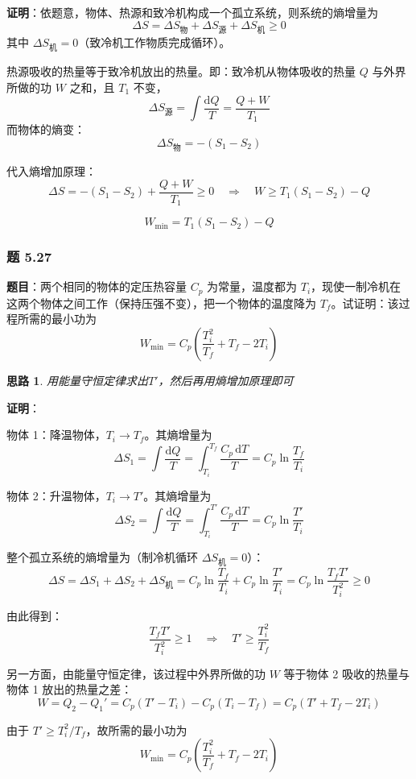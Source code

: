 \documentclass[UTF8]{ctexart}
\newtheorem{thoughts}{思路}[subsection]
\begin{document}
\textbf{证明}：依题意，物体、热源和致冷机构成一个孤立系统，则系统的熵增量为
\[
\Delta S=\Delta S_{\text{物}}+\Delta S_{\text{源}}+\Delta S_{\text{机}}\ge 0
\]
其中 $\Delta S_{\text{机}}=0$（致冷机工作物质完成循环）。

热源吸收的热量等于致冷机放出的热量。即：致冷机从物体吸收的热量 $Q$ 与外界所做的功 $W$ 之和，且 $T_1$ 不变，
\[
\Delta S_{\text{源}}=\int\frac{\mathrm{d}Q}{T}=\frac{Q+W}{T_1}
\]
而物体的熵变：
\[
\Delta S_{\text{物}}=-(S_1-S_2)
\]

代入熵增加原理：
\[
\Delta S=-(S_1-S_2)+\frac{Q+W}{T_1}\ge 0
\quad\Longrightarrow\quad
W\ge T_1(S_1-S_2)-Q
\]

\[
\boxed{W_{\min}=T_1(S_1-S_2)-Q}
\]

\subsubsection{题 5.27}

\textbf{题目}：两个相同的物体的定压热容量 $C_p$ 为常量，温度都为 $T_i$，现使一制冷机在这两个物体之间工作（保持压强不变），把一个物体的温度降为 $T_f$。试证明：该过程所需的最小功为
\[
W_{\min}=C_p\left(\frac{T_i^2}{T_f}+T_f-2T_i\right)
\]

\begin{thoughts}
  用能量守恒定律求出$T'$，然后再用熵增加原理即可
\end{thoughts}

\textbf{证明}：

物体 1：降温物体，$T_i\to T_f$。其熵增量为
\[
\Delta S_1=\int\frac{\mathrm{d}Q}{T}=\int_{T_i}^{T_f}\frac{C_p\,\mathrm{d}T}{T}
=C_p\ln\frac{T_f}{T_i}
\]

物体 2：升温物体，$T_i\to T'$。其熵增量为
\[
\Delta S_2=\int\frac{\mathrm{d}Q}{T}=\int_{T_i}^{T'}\frac{C_p\,\mathrm{d}T}{T}
=C_p\ln\frac{T'}{T_i}
\]

整个孤立系统的熵增量为（制冷机循环 $\Delta S_{\text{机}}=0$）：
\[
\Delta S=\Delta S_1+\Delta S_2+\Delta S_{\text{机}}
=C_p\ln\frac{T_f}{T_i}+C_p\ln\frac{T'}{T_i}
=C_p\ln\frac{T_fT'}{T_i^2}\ge 0
\]

由此得到：
\[
\frac{T_fT'}{T_i^2}\ge 1\quad\Longrightarrow\quad
T'\ge \frac{T_i^2}{T_f}
\]

另一方面，由能量守恒定律，该过程中外界所做的功 $W$ 等于物体 2 吸收的热量与物体 1 放出的热量之差：
\[
W=Q_2-Q_1'=C_p(T'-T_i)-C_p(T_i-T_f)
=C_p(T'+T_f-2T_i)
\]

由于 $T'\ge T_i^2/T_f$，故所需的最小功为
\[
W_{\min}=C_p\left(\frac{T_i^2}{T_f}+T_f-2T_i\right)
\]
\end{document}
